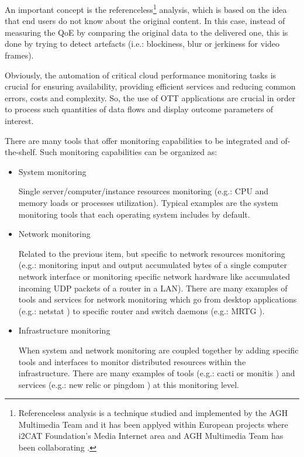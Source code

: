 An important concept is the referenceless\footnote{Referenceless analysis is a technique studied and implemented by the AGH Multimedia Team \cite{AGHTEAM} and it has been applyed within European projects \cite{mitsu} where i2CAT Foundation's Media Internet area and AGH Multimedia Team has been collaborating \cite{AGHQOE}.} analysis, which is based on the idea that end users do not know about the original content. In this case, instead of measuring the QoE by comparing the original data to the delivered one, this is done by trying to detect artefacts (i.e.: blockiness, blur or jerkiness for video frames).

Obviously, the automation of critical cloud performance monitoring tasks is crucial for ensuring availability, providing efficient services and reducing common errors, costs and complexity. So, the use of OTT applications are crucial in order to process such quantities of data flows and display outcome parameters of interest. 

There are many tools that offer monitoring capabilities to be integrated and of-the-shelf. Such monitoring capabilities can be organized as:

\begin{itemize}
\item System monitoring \hfill

Single server/computer/instance resources monitoring (e.g.: CPU and memory loads or processes utilization). Typical examples are the system monitoring tools that each operating system includes by default.
\item Network monitoring \hfill

Related to the previous item, but specific to network resources monitoring (e.g.: monitoring input and output accumulated bytes of a single computer network interface or monitoring specific network hardware like accumulated incoming UDP packets of a router in a LAN). There are many examples of tools and services for network monitoring which go from desktop applications (e.g.: netstat \cite{netstat}) to specific router and switch daemons (e.g.: MRTG \cite{MRTG}).
\item Infrastructure monitoring \hfill

When system and network monitoring are coupled together by adding specific tools and interfaces to monitor distributed resources within the infrastructure. There are many examples of tools  (e.g.: cacti \cite{cacti} or monitis \cite{monitis}) and services (e.g.: new relic \cite{newrelic} or pingdom \cite{pingdom}) at this monitoring level.
\end{itemize}

